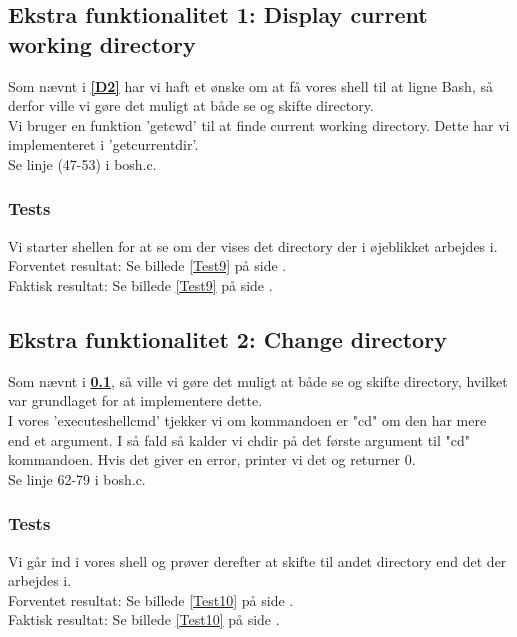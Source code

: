 \subsection{Ekstra funktionalitet 1: Display current working directory}
\label{E1}
Som nævnt i \textbf{\ref{D2}} har vi haft et ønske om at få vores shell til at ligne Bash, så derfor ville vi gøre det muligt at både se og skifte directory.
\\Vi bruger en funktion 'getcwd' til at finde current working directory. Dette har vi implementeret i 'getcurrentdir'.
\\Se linje (47-53) i bosh.c.
\subsubsection{Tests}
Vi starter shellen for at se om der vises det directory der i øjeblikket arbejdes i.
\\Forventet resultat: Se billede \ref{Test9} på side \pageref{Test9}.
\\Faktisk resultat: Se billede \ref{Test9} på side \pageref{Test9}.

\subsection{Ekstra funktionalitet 2: Change directory}
\label{E2}
Som nævnt i \textbf{\ref{E1}}, så ville vi gøre det muligt at både se og skifte directory, hvilket var grundlaget for at implementere dette.
\\I vores 'executeshellcmd' tjekker vi om kommandoen er "cd" om den har mere end et argument. I så fald så kalder vi chdir på det første argument til "cd" kommandoen. Hvis det giver en error, printer vi det og returner 0.
\\Se linje 62-79 i bosh.c.
\subsubsection{Tests}
Vi går ind i vores shell og prøver derefter at skifte til andet directory end det der arbejdes i.
\\Forventet resultat: Se billede \ref{Test10} på side \pageref{Test10}.
\\Faktisk resultat: Se billede \ref{Test10} på side \pageref{Test10}.